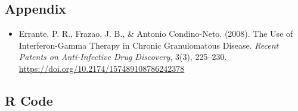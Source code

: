 \documentclass{article}
\begin{document}
	\newpage
	\subsection*{Appendix}

	\begin{itemize}
		\item Errante, P. R., Frazao, J. B., \& Antonio Condino-Neto. (2008). The Use of Interferon-Gamma Therapy in Chronic Granulomatous Disease. \textit{Recent Patents on Anti-Infective Drug Discovery}, 3(3), 225--230. \url{https://doi.org/10.2174/157489108786242378}
	\end{itemize}

	\subsection*{R Code}
\end{document}
